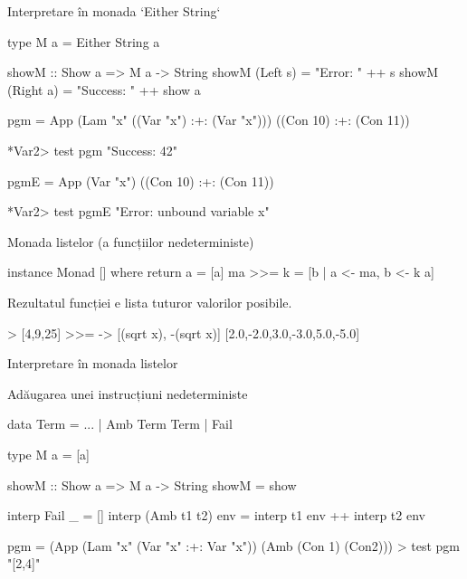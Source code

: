 \documentclass[xcolor=pdftex,romanian,colorlinks]{beamer}
\begin{document}
\begin{frame}[fragile]{Interpretare în monada `Either String`}
\begin{asciihs}
type M a = Either String a

showM :: Show a => M a -> String
showM (Left s)  = "Error: " ++ s
showM (Right a) = "Success: " ++ show a
\end{asciihs}

 
\begin{asciihs}
pgm = App 
          (Lam "x" ((Var "x") :+: (Var "x")))
          ((Con 10) :+:  (Con 11))
          
*Var2> test pgm
"Success: 42"          
\end{asciihs}

\pause
 
\begin{asciihs}
pgmE = App (Var "x") ((Con 10) :+:  (Con 11))
          
*Var2> test pgmE
"Error: unbound variable x"
\end{asciihs}
\end{frame}

\begin{frame}[fragile]{Monada listelor (a funcțiilor nedeterministe)}


\begin{asciihs}
instance Monad [] where
  return a = [a]
  ma >>= k = [b | a <- ma, b <- k a]
\end{asciihs}

Rezultatul funcției e lista tuturor valorilor posibile.



\begin{asciihs}
> [4,9,25] >>= \x -> [(sqrt x), -(sqrt x)]
[2.0,-2.0,3.0,-3.0,5.0,-5.0]

\end{asciihs}
\end{frame}

\begin{frame}[fragile]{Interpretare în monada listelor}

Adăugarea unei instrucțiuni nedeterministe

\begin{asciihs}
data Term = ... | Amb Term Term | Fail

type M a = [a]

showM :: Show a => M a -> String
showM = show

interp Fail _ = []
interp (Amb t1 t2) env = interp t1 env ++ interp t2 env
\end{asciihs}

\begin{asciihs}
pgm = (App (Lam "x" (Var "x" :+: Var "x")) 
      (Amb (Con 1) (Con2))) 
> test pgm 
"[2,4]"
\end{asciihs}
\end{frame}
\end{document}
